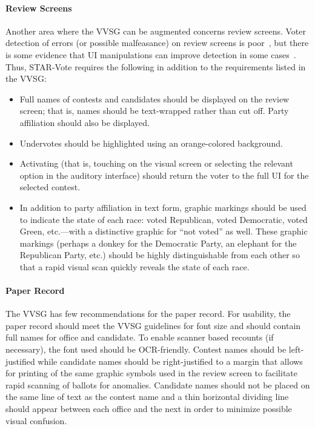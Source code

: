 \documentclass[letterpaper, 10pt, twocolumn]{article}
\newcommand{\projname}{STAR-Vote\xspace}
\begin{document}
\paragraph{Review Screens}
Another area where the VVSG can be augmented concerns review screens. Voter detection of errors (or possible malfeasance) on review screens is poor~\cite{everett07thesis}, but there is some evidence that UI manipulations can improve detection in some cases~\cite{campbell-evt09}. Thus, \projname  requires the following in addition to the requirements listed in the VVSG:
\begin{itemize}
\item  Full names of contests and candidates should be displayed on the review screen; that is, names should be text-wrapped rather than cut off. Party affiliation should also be displayed.
\item Undervotes should be highlighted using an orange-colored background. 
\item Activating (that is, touching on the visual screen or selecting the relevant option in the auditory interface) should return the voter to the full UI for the selected contest.
\item In addition to party affiliation in text form, graphic markings should be used to indicate the state of each race: voted Republican, voted Democratic, voted Green, etc.---with a distinctive graphic for ``not voted'' as well. These graphic markings (perhaps a donkey for the Democratic Party, an elephant for the Republican Party, etc.) should be highly distinguishable from each other so that a rapid visual scan quickly reveals the state of each race.
\end{itemize}

\paragraph{Paper Record}
The VVSG has few recommendations for the paper record. For usability, the paper record should meet the VVSG guidelines for font size and should contain full names for office and candidate. To enable scanner based recounts (if necessary), the font used should be OCR-friendly. Contest names should be left-justified while candidate names should be right-justified to a margin that allows for printing of the same graphic symbols used in the review screen to facilitate rapid scanning of ballots for anomalies. Candidate names should not be placed on the same line of text as the contest name and a thin horizontal dividing line should appear between each office and the next in order to minimize possible visual confusion.
\end{document}
